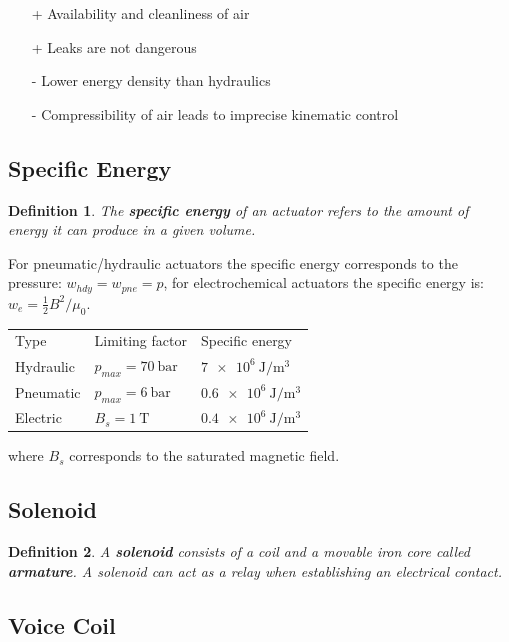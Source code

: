 \documentclass[10pt,a4paper]{scrartcl}
\newtheorem{define}{Definition}
\begin{document}
\begin{multicols*}{2}
\begin{itemize}
\item[+] Availability and cleanliness of air
\item[+] Leaks are not dangerous
\item[-] Lower energy density than hydraulics
\item[-] Compressibility of air leads to imprecise kinematic control
\end{itemize}

\subsection{Specific Energy}

\begin{define}
The \textbf{specific energy} of an actuator refers to the amount of energy it can produce in a given volume.
\end{define}

For pneumatic/hydraulic actuators the specific energy corresponds to the pressure: $w_{hdy}=w_{pne}=p$, for electrochemical actuators the specific energy is: $w_e=\frac{1}{2}B^2/\mu_0$.

\begin{tabular}{|l|l|l|}
Type&Limiting factor&Specific energy\\
Hydraulic&$p_{max}=\SI{70}{\bar}$&$\SI{7e6}{\joule\per\meter\cubed}$\\
Pneumatic&$p_{max}=\SI{6}{\bar}$&$\SI{0.6e6}{\joule\per\meter\cubed}$\\
Electric&$B_s=\SI{1}{\tesla}$&$\SI{0.4e6}{\joule\per\meter\cubed}$
\end{tabular}

where $B_s$ corresponds to the saturated magnetic field.

\subsection{Solenoid}

\begin{define}
A \textbf{solenoid} consists of a coil and a movable iron core called \textbf{armature}. A solenoid can act as a  relay when establishing an electrical contact.
\end{define}

\subsection{Voice Coil}


\end{multicols*}
\end{document}
